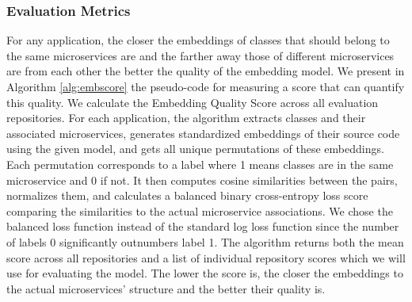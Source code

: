 

\begin{table}[ht]
\caption{Microservices and Modular Monolith application data.}
\label{tab:microapps}
\end{table}

\subsubsection{Evaluation Metrics}\label{subsubsec:rq1metrics}
For any application, the closer the embeddings of classes that should belong to the same microservices are and the farther away those of different microservices are from each other the better the quality of the embedding model. We present in Algorithm \ref{alg:embscore} the pseudo-code for measuring a score that can quantify this quality. We calculate the Embedding Quality Score across all evaluation repositories. For each application, the algorithm extracts classes and their associated microservices, generates standardized embeddings of their source code using the given model, and gets all unique permutations of these embeddings. Each permutation corresponds to a label where 1 means classes are in the same microservice and 0 if not. It then computes cosine similarities between the pairs, normalizes them, and calculates a balanced binary cross-entropy loss score comparing the similarities to the actual microservice associations. We chose the balanced loss function instead of the standard log loss function since the number of labels 0 significantly outnumbers label 1. The algorithm returns both the mean score across all repositories and a list of individual repository scores which we will use for evaluating the model. The lower the score is, the closer the embeddings to the actual microservices' structure and the better their quality is.


